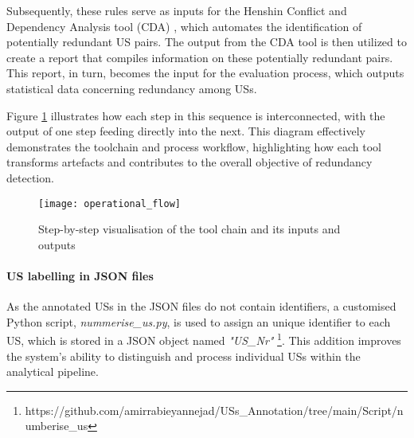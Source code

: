 Subsequently, these rules serve as inputs for the Henshin Conflict and Dependency Analysis tool (CDA) \cite{mens2007analysing}, which automates the identification of potentially redundant US pairs. The output from the CDA tool is then utilized to create a report that compiles information on these potentially redundant pairs. This report, in turn, becomes the input for the evaluation process, which outputs statistical data concerning redundancy among USs.

Figure \ref{fig:operational_flow} illustrates how each step in this sequence is interconnected, with the output of one step feeding directly into the next. This diagram effectively demonstrates the toolchain and process workflow, highlighting how each tool transforms artefacts and contributes to the overall objective of redundancy detection.
\begin{figure}[h]
	\centering 
	\texttt{[image: operational\_flow]}
	\caption{Step-by-step visualisation of the tool chain and its inputs and outputs}\label{fig:operational_flow}
\end{figure}



\paragraph{US labelling in JSON files}\label{workflow_nummerize_us}
As the annotated USs in the JSON files do not contain identifiers, a customised Python script, \textit{nummerise\_us.py}, is used to assign an unique identifier to each US, which is stored in a JSON object named \textit{"US\_Nr"} \footnote{https://github.com/amirrabieyannejad/USs\_Annotation/tree/main/Script/numberise\_us}. This addition improves the system's ability to distinguish and process individual USs within the analytical pipeline.


